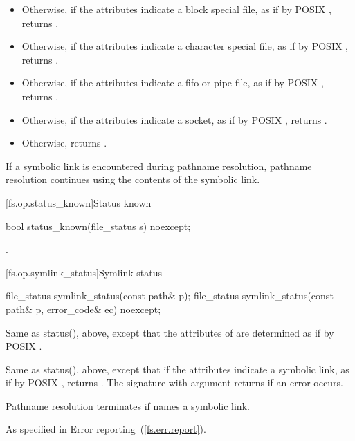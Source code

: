 \begin{itemdescr}
\begin{itemize}
\begin{itemize}
\item Otherwise, if the attributes indicate a block special file, as if by
      POSIX , returns .
\item Otherwise, if the attributes indicate a character special file, as if
      by POSIX , returns .
\item Otherwise, if the attributes indicate a fifo or pipe file, as if by
      POSIX , returns .
\item Otherwise, if the attributes indicate a socket, as if by POSIX
      , returns .
\item Otherwise, returns .
\end{itemize}
\end{itemize}

\pnum
\remarks If a symbolic link is encountered during pathname resolution,
      pathname resolution continues using the contents of the symbolic link.
\end{itemdescr}


[fs.op.status_known]{Status known}

\begin{itemdecl}
bool status_known(file_status s) noexcept;
\end{itemdecl}

\begin{itemdescr}
\pnum
\returns {}.
\end{itemdescr}


[fs.op.symlink_status]{Symlink status}

\begin{itemdecl}
file_status symlink_status(const path& p);
file_status symlink_status(const path& p, error_code& ec) noexcept;
\end{itemdecl}

\begin{itemdescr}
\pnum
\effects Same as status(), above,
  except that the attributes
    of  are determined as if by POSIX .

\pnum
\returns Same as status(), above, except
      that if the attributes indicate a symbolic link, as if by POSIX , returns
      .
      The signature with argument  returns
       if an error occurs.

\pnum
\remarks Pathname resolution terminates if  names a symbolic link.

\pnum
\throws As specified in Error reporting~(\ref{fs.err.report}).
\end{itemdescr}


